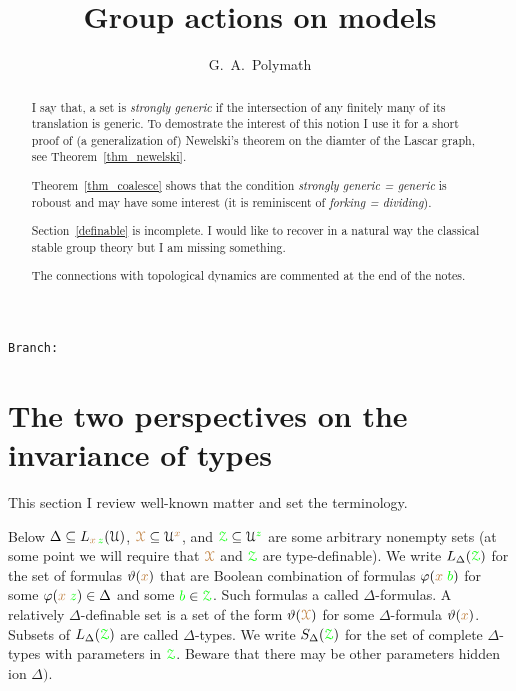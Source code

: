 \documentclass[10pt,openany]{amsproc}
\def\X{\EuScript X}
\def\Z{\EuScript Z}
\def\U{\EuScript U}
\def\theta{\vartheta}
\def\phi{\varphi}
\newcounter{thm}
\theoremstyle{mio}
\def\mr{\color{brown}}
\def\gr{\color{green}}
\def\mrX{{\mr\X}}
\def\grZ{{\gr\Z}}
\newcommand\branch{}
\begin{document}
\author{G.\ A.\ Polymath}
\title{Group actions on models}
\hfill\texttt{Branch:\ \branch\ \DTMnow}
\maketitle
\raggedbottom
\begin{abstract}
  \setlength{\parindent}{0ex}
  \setlength{\parskip}{.4\baselineskip}
  I say that, a set is \textit{strongly generic\/} if the intersection of any finitely many of its translation is generic.
  To demostrate the interest of this notion I use it for a short proof of (a generalization of) Newelski's theorem on the diamter of the Lascar graph, see Theorem~\ref{thm_newelski}.

  Theorem~\ref{thm_coalesce} shows that the condition \textit{strongly generic = generic\/} is roboust and may have some interest (it is reminiscent of \textit{forking = dividing\/}).

  Section~\ref{definable} is incomplete.
  I would like to recover in a natural way the classical stable group theory but I am missing something.
  
  The connections with topological dynamics are commented at the end of the notes.
\end{abstract}

\def\medrel#1{\parbox[t]{5ex}{$\displaystyle\hfil #1$}}
\def\ceq#1#2#3{\parbox[t]{17ex}{$\displaystyle #1$}\medrel{#2}{$\displaystyle #3$}}

\section{The two perspectives on the invariance of types}

This section I review well-known matter and set the terminology.

Below $\Delta\subseteq L_{{\mr x}\,{\gr z}}(\U)$, ${\mrX}\subseteq\U^{\mr x}$, and ${\grZ}\subseteq\U^{\gr z}$ are some arbitrary nonempty sets (at some point we will require that $\mrX$ and $\grZ$ are type-definable).
We write $L_\Delta({\grZ})$ for the set of formulas $\theta({\mr x})$ that are Boolean combination of formulas $\phi({\mr x}\;{\gr b})$ for some $\phi({\mr x}\;{\gr z})\in\Delta$ and some ${\gr b}\in{\grZ}$.
Such formulas a called $\Delta$-formulas.
A relatively $\Delta$-definable set is a set of the form $\theta(\mrX)$ for some $\Delta$-formula $\theta({\mr x})$.
Subsets of $L_\Delta({\grZ})$ are called $\Delta$-types.
We write $S_\Delta({\grZ})$ for the set of complete $\Delta$-types with parameters in $\grZ$. Beware that there may be other parameters hidden ion $\Delta)$.
\end{document}
